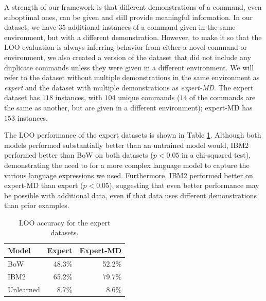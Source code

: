 \documentclass[conference]{IEEEtran}
\begin{document}
A strength of our framework is that different demonstrations of a command, even suboptimal ones, can be given and still provide meaningful information. In our dataset, we have $35$ additional instances of a command given in the same environment, but with a different demonstration. However, to make it so that the LOO evaluation is always inferring behavior from either a novel command or environment, we also created a version of the dataset that did not include any duplicate commands unless they were given in a different environment. We will refer to the dataset without multiple demonstrations in the same environment as {\em expert} and the dataset with multiple demonstrations as {\em expert-MD}. The expert dataset has $118$ instances, with $104$ unique commands ($14$ of the commands are the same as another, but are given in a different environment); expert-MD has $153$ instances. %

The LOO performance of the expert datasets is shown in Table \ref{tab:res_e}. Although both models performed substantially better than an untrained model would, IBM2 performed better than BoW on both datasets ($p<0.05$ in a chi-squared test), demonstrating the need to for a more complex language model to capture the various language expressions we used. Furthermore, IBM2 performed better on expert-MD than expert ($p<0.05$), suggesting that even better performance may be possible with additional data, even if that data uses different demonstrations than prior examples. 

\begin{table}[tb]
\begin{center}
\begin{tabular}{@{}lrr@{}} \toprule
Model & Expert & Expert-MD \\ \midrule
 BoW & 48.3\% & 52.2\% \\ 
 IBM2 & 65.2\% & 79.7\%  \\ 
 Unlearned & 8.7\% & 8.6\% \\ \bottomrule
\hline
 \end{tabular} 
 \caption{LOO accuracy for the expert datasets.}
 \label{tab:res_e}
\end{center}
\end{table}
\end{document}
